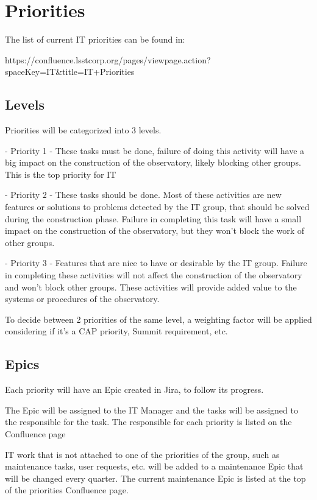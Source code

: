 \section{Priorities} 


The list of current IT priorities can be found in:

https://confluence.lsstcorp.org/pages/viewpage.action?spaceKey=IT&title=IT+Priorities

\subsection{Levels }

Priorities will be categorized into 3 levels.

  - Priority 1 - These tasks must be done, failure of doing this activity will have a big impact on the construction of the observatory, likely blocking other groups. This is the top priority for IT

  - Priority 2 - These tasks should be done. Most of these activities are new features or solutions to problems detected by the IT group, that should be solved during the construction phase. Failure in completing this task will have a small impact on the construction of the observatory, but they won't block the work of other groups.

  - Priority 3 - Features that are nice to have or desirable by the IT group. Failure in completing these activities will not affect the construction of the observatory and won't block other groups. These activities will provide added value to the systems or procedures of the observatory.

To decide between 2 priorities of the same level, a weighting factor will be applied considering if it's a CAP priority, Summit requirement, etc.

\subsection{Epics }

Each priority will have an Epic created in Jira, to follow its progress.

The Epic will be assigned to the IT Manager and the tasks will be assigned to the responsible for the task. The responsible for each priority is listed on the Confluence page

IT work that is not attached to one of the priorities of the group, such as maintenance tasks, user requests, etc. will be added to a maintenance Epic that will be changed every quarter. The current maintenance Epic is listed at the top of the priorities Confluence page.

